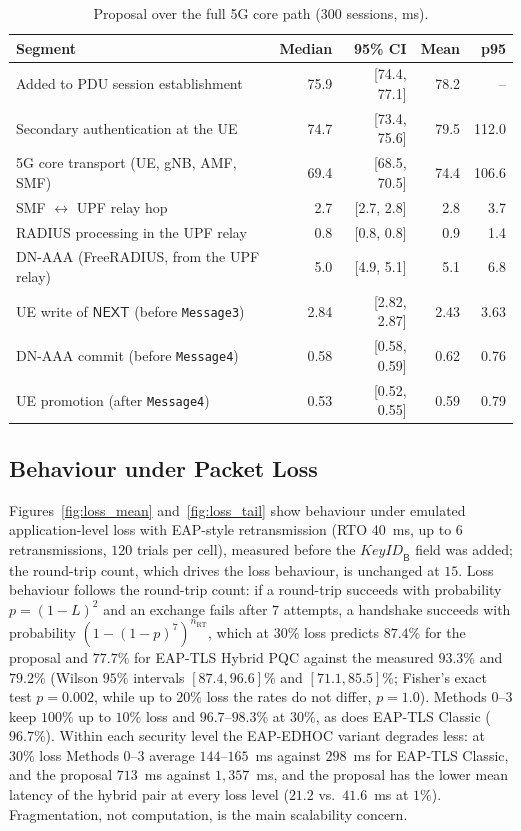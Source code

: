 \documentclass[symmetry,article,submit,moreauthors]{Definitions/mdpi}
\begin{document}
\begin{table}[H]
\caption{Proposal over the full 5G core path ($300$ sessions, ms).\label{tab:fullstack}}
\footnotesize
\begin{tabular*}{\textwidth}{@{\extracolsep{\fill}}lrrrr@{}}
\toprule
\textbf{Segment} & \textbf{Median} & \textbf{95\% CI} & \textbf{Mean} & \textbf{p95} \\
\midrule
Added to PDU session establishment & 75.9 & [74.4, 77.1] & 78.2 & -- \\
Secondary authentication at the UE & 74.7 & [73.4, 75.6] & 79.5 & 112.0 \\
\quad 5G core transport (UE, gNB, AMF, SMF) & 69.4 & [68.5, 70.5] & 74.4 & 106.6 \\
\quad SMF $\leftrightarrow$ UPF relay hop & 2.7 & [2.7, 2.8] & 2.8 & 3.7 \\
\quad RADIUS processing in the UPF relay & 0.8 & [0.8, 0.8] & 0.9 & 1.4 \\
\quad DN-AAA (FreeRADIUS, from the UPF relay) & 5.0 & [4.9, 5.1] & 5.1 & 6.8 \\
\midrule
UE write of $\mathsf{NEXT}$ (before \texttt{Message3}) & 2.84 & [2.82, 2.87] & 2.43 & 3.63 \\
DN-AAA commit (before \texttt{Message4}) & 0.58 & [0.58, 0.59] & 0.62 & 0.76 \\
UE promotion (after \texttt{Message4}) & 0.53 & [0.52, 0.55] & 0.59 & 0.79 \\
\bottomrule
\end{tabular*}
\end{table}

\subsection{Behaviour under Packet Loss}
Figures~\ref{fig:loss_mean} and~\ref{fig:loss_tail} show behaviour under emulated application-level loss with EAP-style retransmission (RTO 40~ms, up to $6$ retransmissions, $120$ trials per cell), measured before the $\mathit{KeyID}_{\mathsf{B}}$ field was added; the round-trip count, which drives the loss behaviour, is unchanged at $15$. Loss behaviour follows the round-trip count: if a round-trip succeeds with probability $p=(1-L)^2$ and an exchange fails after $7$ attempts, a handshake succeeds with probability $(1-(1-p)^7)^{n_{\mathrm{RT}}}$, which at $30\%$ loss predicts $87.4\%$ for the proposal and $77.7\%$ for EAP-TLS Hybrid PQC against the measured $93.3\%$ and $79.2\%$ (Wilson $95\%$ intervals $[87.4, 96.6]\%$ and $[71.1, 85.5]\%$; Fisher's exact test $p=0.002$, while up to $20\%$ loss the rates do not differ, $p=1.0$). Methods 0--3 keep $100\%$ up to $10\%$ loss and $96.7$--$98.3\%$ at $30\%$, as does EAP-TLS Classic ($96.7\%$). Within each security level the EAP-EDHOC variant degrades less: at $30\%$ loss Methods 0--3 average $144$--$165$~ms against $298$~ms for EAP-TLS Classic, and the proposal $713$~ms against $1{,}357$~ms, and the proposal has the lower mean latency of the hybrid pair at every loss level ($21.2$ vs.\ $41.6$~ms at $1\%$). Fragmentation, not computation, is the main scalability concern.
\end{document}
